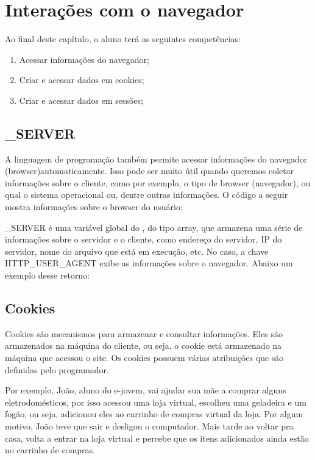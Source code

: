 \chapter{Interações com o navegador}
\label{interacoes-com-o-navegador}

Ao final deste capítulo, o aluno terá as seguintes competências:
\begin{enumerate}
    \item Acessar informações do navegador;
    \item Criar e acessar dados em cookies;
    \item Criar e acessar dados em sessões;
\end{enumerate}

\section{\textdollar_SERVER}
\label{variavel-server}

A linguagem de programação \php também permite acessar informações do navegador (browser)automaticamente. Isso pode ser muito útil quando queremos coletar informações sobre o cliente, como por exemplo, o tipo de browser (navegador), ou qual o sistema operacional ou, dentre outras informações.
O código a seguir mostra informações sobre o browser do usuário:



\textdollar_SERVER é uma variável global do \php, do tipo array, que armazena uma série de informações sobre o servidor e o cliente, como endereço do servidor, IP do servidor, nome do arquivo que está em execução, etc. No caso, a chave HTTP_USER_AGENT exibe as informações sobre o navegador. Abaixo um exemplo desse retorno:

\section{Cookies}
\label{cookies}

Cookies são mecanismos para armazenar e consultar informações. Eles são armazenados na máquina do cliente, ou seja, o cookie está armazenado na máquina que acessou o site. Os cookies possuem várias atribuições que são definidas pelo programador.

Por exemplo, João, aluno do e-jovem, vai ajudar sua mãe a comprar alguns eletrodomésticos, por isso acessou uma loja virtual, escolheu uma geladeira e um fogão, ou seja, adicionou eles ao carrinho de compras virtual da loja. Por algum motivo, João teve que sair e desligou o computador. Mais tarde ao voltar pra casa, volta a entrar na loja virtual e percebe que os itens adicionados ainda estão no carrinho de compras.

